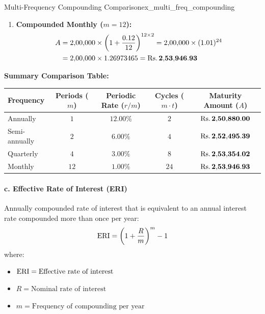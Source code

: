 \begin{example}{Multi-Frequency Compounding Comparison}{ex_multi_freq_compounding}
\begin{enumerate}[leftmargin=*]
    \item \textbf{Compounded Monthly ($m = 12$):}
    \begin{align*}
        A &= 2{,}00{,}000 \times \left(1 + \frac{0.12}{12}\right)^{12 \times 2} = 2{,}00{,}000 \times (1.01)^{24} \\
        &= 2{,}00{,}000 \times 1.26973465 = \mathbf{\text{Rs.}\, 2{,}53{,}946.93}
    \end{align*}
\end{enumerate}

\tcbline
\textbf{Summary Comparison Table:}
\begin{center}
\footnotesize
\setlength{\tabcolsep}{4pt}
\begin{tabular}{lcccc}
\toprule
\textbf{Frequency} & \textbf{Periods ($m$)} & \textbf{Periodic Rate ($r/m$)} & \textbf{Cycles ($m \cdot t$)} & \textbf{Maturity Amount ($A$)} \\
\midrule
Annually & $1$ & $12.00\%$ & $2$ & $\mathbf{\text{Rs.}\, 2{,}50{,}880.00}$ \\
Semi-annually & $2$ & $6.00\%$ & $4$ & $\mathbf{\text{Rs.}\, 2{,}52{,}495.39}$ \\
Quarterly & $4$ & $3.00\%$ & $8$ & $\mathbf{\text{Rs.}\, 2{,}53{,}354.02}$ \\
Monthly & $12$ & $1.00\%$ & $24$ & $\mathbf{\text{Rs.}\, 2{,}53{,}946.93}$ \\
\bottomrule
\end{tabular}
\end{center}
\end{example}

\begin{formulabox}
\paragraph{c. Effective Rate of Interest (ERI)}
Annually compounded rate of interest that is equivalent to an annual interest rate compounded more than once per year:
\begin{equation}
    \operatorname{ERI} = \left(1 + \frac{R}{m}\right)^m - 1
\end{equation}
where:
\begin{itemize}[noitemsep]
    \item $\operatorname{ERI} = \text{Effective rate of interest}$
    \item $R = \text{Nominal rate of interest}$
    \item $m = \text{Frequency of compounding per year}$
\end{itemize}
\end{formulabox}

